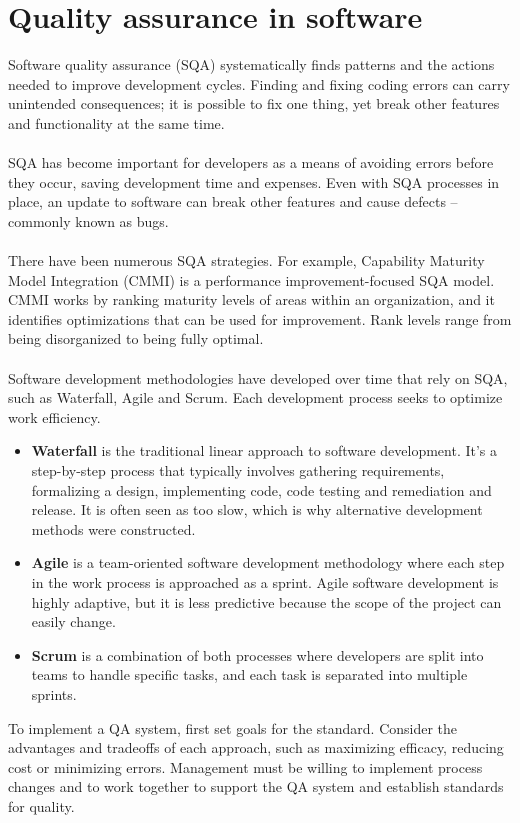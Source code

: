 \documentclass{article}
\begin{document}
\section{Quality assurance in software}
Software quality assurance (SQA) systematically finds patterns and the actions needed to improve development cycles. Finding and fixing coding errors can carry unintended consequences; it is possible to fix one thing, yet break other features and functionality at the same time.\\~\\
SQA has become important for developers as a means of avoiding errors before they occur, saving development time and expenses. Even with SQA processes in place, an update to software can break other features and cause defects -- commonly known as bugs.\\~\\
There have been numerous SQA strategies. For example, Capability Maturity Model Integration (CMMI) is a performance improvement-focused SQA model. CMMI works by ranking maturity levels of areas within an organization, and it identifies optimizations that can be used for improvement. Rank levels range from being disorganized to being fully optimal.\\~\\
Software development methodologies have developed over time that rely on SQA, such as Waterfall, Agile and Scrum. Each development process seeks to optimize work efficiency.
\begin{itemize}
\item \textbf{Waterfall} is the traditional linear approach to software development. It's a step-by-step process that typically involves gathering requirements, formalizing a design, implementing code, code testing and remediation and release. It is often seen as too slow, which is why alternative development methods were constructed.
\item \textbf{Agile} is a team-oriented software development methodology where each step in the work process is approached as a sprint. Agile software development is highly adaptive, but it is less predictive because the scope of the project can easily change.
\item \textbf{Scrum} is a combination of both processes where developers are split into teams to handle specific tasks, and each task is separated into multiple sprints.
\end{itemize}
To implement a QA system, first set goals for the standard. Consider the advantages and tradeoffs of each approach, such as maximizing efficacy, reducing cost or minimizing errors. Management must be willing to implement process changes and to work together to support the QA system and establish standards for quality.
\end{document}
